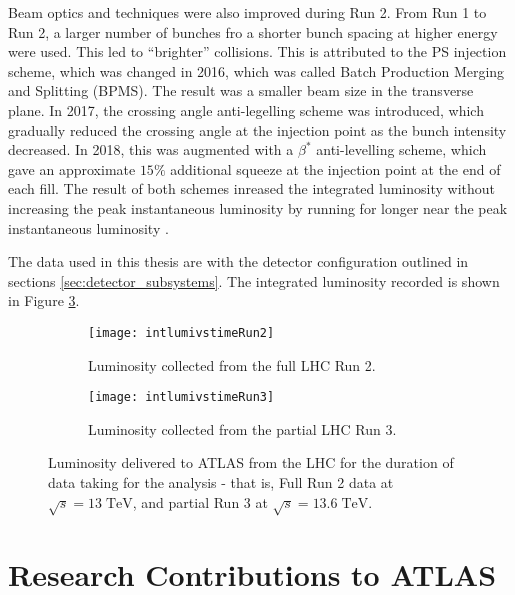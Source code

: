 \documentclass[12pt]{article}
\newcommand{\un}[1]{\;\text{#1}}
\begin{document}
Beam optics and techniques were also improved during Run 2. From Run 1 to Run 2,
a larger number of bunches fro a shorter bunch spacing at higher energy were
used. This led to ``brighter'' collisions. This is attributed to the PS
injection scheme, which was changed in 2016, which was called Batch Production
Merging and Splitting (BPMS). The result was a smaller beam size in the
transverse plane. In 2017, the crossing angle anti-legelling scheme was
introduced, which gradually reduced the crossing angle at the injection point as
the bunch intensity decreased. In 2018, this was augmented with a $\beta^*$
anti-levelling scheme, which gave an approximate $15\%$ additional squeeze at
the injection point at the end of each fill. The result of both schemes inreased
the integrated luminosity without increasing the peak instantaneous luminosity
by running for longer near the peak instantaneous luminosity \cite{Aad_2024}.

The data used in this thesis are with the detector configuration outlined in
sections \ref{sec:detector_subsystems}. The integrated luminosity recorded is
shown in Figure \ref{fig:lhc_luminosity}.


\begin{figure}[t!]
    \centering
    \begin{subfigure}[t]{.48\textwidth}
        \centering
        \texttt{[image: intlumivstimeRun2]}
        \caption{Luminosity collected from the full LHC Run 2.}
        \label{subfig:lumi_run2}
    \end{subfigure}
    \hfill
    \begin{subfigure}[t]{.48\textwidth}
        \centering
        \texttt{[image: intlumivstimeRun3]}
        \caption{Luminosity collected from the partial LHC Run 3.}
        \label{subfig:lumi_run3}
    \end{subfigure}
\caption{Luminosity delivered to ATLAS from the LHC for the duration of data
taking for the analysis - that is, Full Run 2 data at $\sqrt{s}=13\un{TeV}$, and
partial Run 3 at $\sqrt{s}=13.6\un{TeV}$.}
\label{fig:lhc_luminosity}
\end{figure}

\section{Research Contributions to ATLAS}
\end{document}
